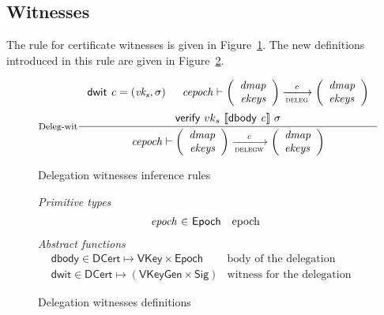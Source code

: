 \documentclass[11pt,a4paper]{article}
\newcommand{\var}[1]{\mathit{#1}}
\newcommand{\fun}[1]{\mathsf{#1}}
\newcommand{\type}[1]{\mathsf{#1}}
\newcommand{\trans}[2]{\xlongrightarrow[\textsc{#1}]{#2}}
\newcommand{\VKey}{\type{VKey}}
\newcommand{\Sig}{\type{Sig}}
\newcommand{\DCert}{\type{DCert}}
\newcommand{\Epoch}{\type{Epoch}}
\newcommand{\VKeyGen}{\type{VKeyGen}}
\newcommand{\verify}[3]{\fun{verify} ~ #1 ~ #2 ~ #3}
\newcommand{\serialised}[1]{\llbracket \var{#1} \rrbracket}
\newcommand{\dbody}[1]{\fun{dbody}~\var{#1}}
\newcommand{\dwit}[1]{\fun{dwit}~\var{#1}}
\begin{document}
\subsection{Witnesses}
\label{sec:delegation-witnesses}

The rule for certificate witnesses is given in
Figure~\ref{fig:deleg-witnesses}. The new definitions introduced in this rule
are given in Figure~\ref{fig:delegation-witnesses-defs}.

\begin{figure}
  \begin{equation}
    \label{eq:deleg-witnesses}
    \inference[Deleg-wit]
    { \dwit{c} = (\var{vk_s}, \sigma)
      & \var{cepoch} \vdash
      {\left(
        \begin{array}{r}
          \var{dmap}\\
          \var{ekeys}
        \end{array}
      \right)}
      \trans{deleg}{c}
      {\left(
      \begin{array}{l}
          \var{dmap}\\
          \var{ekeys}
      \end{array}
      \right)}
      \\ ~ \\
      \verify{vk_s}{\serialised{\dbody{c}}}{\sigma}
    }
    {\var{cepoch} \vdash
      {\left(
        \begin{array}{r}
          \var{dmap}\\
          \var{ekeys}
        \end{array}
      \right)}
      \trans{delegw}{c}
      {\left(
      \begin{array}{l}
          \var{dmap}\\
          \var{ekeys}
      \end{array}
      \right)}}
  \end{equation}
  \caption{Delegation witnesses inference rules}
  \label{fig:deleg-witnesses}
\end{figure}

\begin{figure}
  \emph{Primitive types}
  \begin{equation*}
    \begin{array}{r@{~\in~}lr}
      \var{epoch} & \Epoch & \text{epoch}
    \end{array}
  \end{equation*}
    \emph{Abstract functions}
  \begin{align*}
      & \fun{dbody} \in \DCert \mapsto \VKey \times \Epoch & \text{body of the delegation certificate}\\
      & \fun{dwit} \in \DCert \mapsto (\VKeyGen \times \Sig) & \text{witness for the delegation certificate}
  \end{align*}
  \caption{Delegation witnesses definitions}
  \label{fig:delegation-witnesses-defs}
\end{figure}
\end{document}
